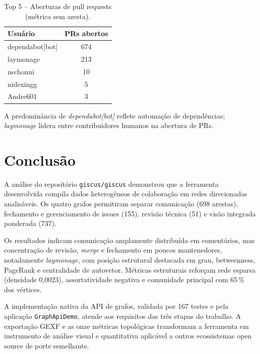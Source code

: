 \documentclass[12pt]{article}
\begin{document}
\begin{table}[H]
\centering
\caption{Top 5 -- Aberturas de pull requests (métrica sem aresta).}
\small
\begin{tabular}{|l|c|}
\hline
\textbf{Usuário} & \textbf{PRs abertos} \\
\hline dependabot[bot] & 674 \\
\hline laymonage & 213 \\
\hline nschonni & 10 \\
\hline nidexingg & 5 \\
\hline Andre601 & 3 \\
\hline
\end{tabular}
\label{tab:prs}
\end{table}

A predominância de \textit{dependabot[bot]} reflete automação de dependências; \textit{laymonage} lidera entre contribuidores humanos na abertura de PRs.

\section{Conclusão}
A análise do repositório \texttt{giscus/giscus} demonstrou que a ferramenta desenvolvida compila dados heterogêneos de colaboração em redes direcionadas analisáveis. Os quatro grafos permitiram separar comunicação (698 arestas), fechamento e gerenciamento de issues (155), revisão técnica (51) e visão integrada ponderada (737).

Os resultados indicam comunicação amplamente distribuída em comentários, mas concentração de revisão, \textit{merge} e fechamento em poucos mantenedores, notadamente \textit{laymonage}, com posição estrutural destacada em grau, betweenness, PageRank e centralidade de autovetor. Métricas estruturais reforçam rede esparsa (densidade 0,0023), assortatividade negativa e comunidade principal com 65\,\% dos vértices.

A implementação nativa da API de grafos, validada por 167 testes e pela aplicação \texttt{GraphApiDemo}, atende aos requisitos das três etapas do trabalho. A exportação GEXF e as onze métricas topológicas transformam a ferramenta em instrumento de análise visual e quantitativa aplicável a outros ecossistemas open source de porte semelhante.



\end{document}
